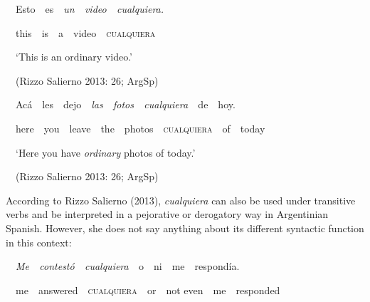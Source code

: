 \begin{styleStandard}
\ \ Esto\ \ es\ \ \textit{un\ \ video\ \ cualquiera.}
\end{styleStandard}

\begin{styleStandard}
\ \ this\ \ is\ \ a\ \ video\ \ \textsc{cualquiera}
\end{styleStandard}

\begin{styleStandard}
\ \ ‘This is an ordinary video.’
\end{styleStandard}

\begin{styleStandard}
\ \ (Rizzo Salierno 2013: 26; ArgSp)
\end{styleStandard}

\begin{styleStandard}
\ \ Acá\ \ les\ \ dejo\ \ \textit{las\ \ fotos\ \ cualquiera\ \ }de\ \ hoy.
\end{styleStandard}

\begin{styleStandard}
\ \ here\ \ you\ \ leave\ \ the\ \ photos\ \ \textsc{cualquiera}\ \ of\ \ today
\end{styleStandard}

\begin{styleStandard}
\ \ ‘Here you have \textit{ordinary} photos of today.’
\end{styleStandard}

\begin{styleStandard}
\ \ (Rizzo Salierno 2013: 26; ArgSp)
\end{styleStandard}

\begin{styleStandard}
According to Rizzo Salierno (2013), \textit{cualquiera} can also be used under transitive verbs and be interpreted in a pejorative or derogatory way in Argentinian Spanish. However, she does not say anything about its different syntactic function in this context:
\end{styleStandard}

\begin{styleStandard}
\ \ \textit{Me\ \ contestó\ \ cualquiera\ \ }o\ \ ni\ \ me\ \ respondía.
\end{styleStandard}

\begin{styleStandard}
\ \ me\ \ answered\ \ \textsc{cualquiera}\textit{\ \ }or\ \ not even\ \ me\ \ responded
\end{styleStandard}

